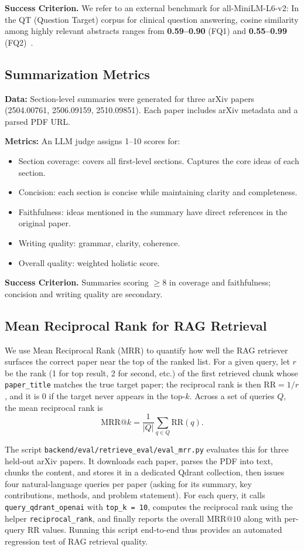 \documentclass{article}
\begin{document}
\textbf{Success Criterion.} We refer to an external benchmark for all-MiniLM-L6-v2: In the QT (Question Target) corpus for clinical question answering, cosine similarity among highly relevant abstracts ranges from \textbf{0.59--0.90} (FQ1) and \textbf{0.55--0.99} (FQ2)~\cite{info2023minilm}.

\subsection{Summarization Metrics}

\textbf{Data:} Section-level summaries were generated for three arXiv papers (2504.00761, 2506.09159, 2510.09851). Each paper includes arXiv metadata and a parsed PDF URL.

\textbf{Metrics:} An LLM judge assigns 1--10 scores for:
\begin{itemize}
  \item Section coverage: covers all first-level sections. Captures the core ideas of each section. 
  \item Concision: each section is concise while maintaining clarity and completeness.
  \item Faithfulness: ideas mentioned in the summary have direct references in the original paper.
  \item Writing quality: grammar, clarity, coherence.
  \item Overall quality: weighted holistic score.
\end{itemize}

\textbf{Success Criterion.} Summaries scoring $\geq 8$ in coverage and faithfulness; concision and writing quality are secondary.

\subsection{Mean Reciprocal Rank for RAG Retrieval}
We use Mean Reciprocal Rank (MRR) to quantify how well the RAG retriever surfaces the correct paper near the top of the ranked list. For a given query, let $r$ be the rank (1 for top result, 2 for second, etc.) of the first retrieved chunk whose \texttt{paper\_title} matches the true target paper; the reciprocal rank is then $\mathrm{RR} = 1/r$, and it is $0$ if the target never appears in the top-$k$. Across a set of queries $Q$, the mean reciprocal rank is
\[
\mathrm{MRR@}k = \frac{1}{|Q|} \sum_{q \in Q} \mathrm{RR}(q).
\]

The script \texttt{backend/eval/retrieve\_eval/eval\_mrr.py} evaluates this for three held-out arXiv papers. It downloads each paper, parses the PDF into text, chunks the content, and stores it in a dedicated Qdrant collection, then issues four natural-language queries per paper (asking for its summary, key contributions, methods, and problem statement). For each query, it calls \texttt{query\_qdrant\_openai} with \texttt{top\_k = 10}, computes the reciprocal rank using the helper \texttt{reciprocal\_rank}, and finally reports the overall $\mathrm{MRR@10}$ along with per-query RR values. Running this script end-to-end thus provides an automated regression test of RAG retrieval quality.
\end{document}
